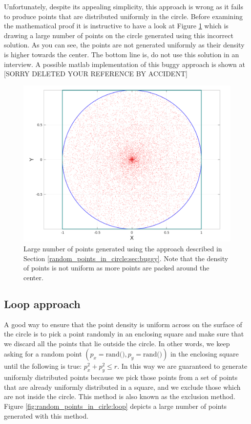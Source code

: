 Unfortunately, despite its appealing simplicity, this approach is wrong as it fails to produce points that are  distributed uniformly in the circle. Before examining the mathematical proof it is instructive to have a look at Figure \ref{fig:random_points_in_cirle:buggy} which is drawing a large number of points on the circle generated using this incorrect solution. As you can see,  the points are not generated uniformly as their density is higher towards the center. 
The bottom line is, do not use this solution in an interview. A possible matlab implementation of this buggy approach is shown at [SORRY DELETED YOUR REFERENCE BY ACCIDENT]



\begin{figure}
	\label{fig:random_points_in_cirle:buggy}
	\centering
	\includegraphics[scale=0.3]{sources/random_points_in_circle/images/buggy_points}
	\caption{Large number of points generated using the approach described in Section \ref{random_points_in_circle:sec:buggy}. Note that the density of points is not uniform as more points are packed around the center.}
\end{figure}

\subsection{Loop approach}
\label{random_points_in_circle:sec:loop}
A good way to ensure that the point density is uniform across on the surface of the circle is to pick a point randomly in an enclosing square and make sure that we discard all the points that lie outside the circle. In other words, we keep asking for a random point $(p_x=\text{rand()}, p_y=\text{rand()})$ in the enclosing square until the following is true: $p_x^2 + p_y^2 \leq r$. In this way we are guaranteed to generate uniformly distributed points because we pick those points from a set of points that are already uniformly distributed in a square, and we exclude those which are not inside the circle. This method is also known as the exclusion method. Figure \ref{fig:random_points_in_cirle:loop} depicts a large number of points generated with this method.

